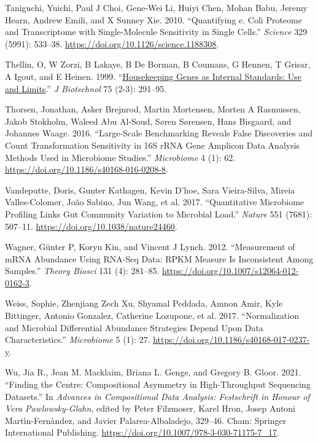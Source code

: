 \documentclass[
]{article}
\newlength{\cslhangindent}
\newlength{\cslentryspacingunit} %
\newenvironment{CSLReferences}[2] %
 {%
  \setlength{\parindent}{0pt}
  \ifodd #1
  \let\oldpar\par
  \def\par{\hangindent=\cslhangindent\oldpar}
  \fi
  \setlength{\parskip}{#2\cslentryspacingunit}
 }%
 {}
\begin{document}
\begin{CSLReferences}{1}{0}
\leavevmode{}%
Taniguchi, Yuichi, Paul J Choi, Gene-Wei Li, Huiyi Chen, Mohan Babu,
Jeremy Hearn, Andrew Emili, and X Sunney Xie. 2010. {``Quantifying e.
Coli Proteome and Transcriptome with Single-Molecule Sensitivity in
Single Cells.''} \emph{Science} 329 (5991): 533--38.
\url{https://doi.org/10.1126/science.1188308}.

\leavevmode{}%
Thellin, O, W Zorzi, B Lakaye, B De Borman, B Coumans, G Hennen, T
Grisar, A Igout, and E Heinen. 1999.
{``\href{https://www.ncbi.nlm.nih.gov/pubmed/10617337}{Housekeeping
Genes as Internal Standards: Use and Limits}.''} \emph{J Biotechnol} 75
(2-3): 291--95.

\leavevmode{}%
Thorsen, Jonathan, Asker Brejnrod, Martin Mortensen, Morten A Rasmussen,
Jakob Stokholm, Waleed Abu Al-Soud, Søren Sørensen, Hans Bisgaard, and
Johannes Waage. 2016. {``Large-Scale Benchmarking Reveals False
Discoveries and Count Transformation Sensitivity in 16{S} r{RNA} Gene
Amplicon Data Analysis Methods Used in Microbiome Studies.''}
\emph{Microbiome} 4 (1): 62.
\url{https://doi.org/10.1186/s40168-016-0208-8}.

\leavevmode{}%
Vandeputte, Doris, Gunter Kathagen, Kevin D'hoe, Sara Vieira-Silva,
Mireia Valles-Colomer, João Sabino, Jun Wang, et al. 2017.
{``Quantitative Microbiome Profiling Links Gut Community Variation to
Microbial Load.''} \emph{Nature} 551 (7681): 507--11.
\url{https://doi.org/10.1038/nature24460}.

\leavevmode{}%
Wagner, Günter P, Koryu Kin, and Vincent J Lynch. 2012. {``Measurement
of mRNA Abundance Using RNA-Seq Data: RPKM Measure Is Inconsistent Among
Samples.''} \emph{Theory Biosci} 131 (4): 281--85.
\url{https://doi.org/10.1007/s12064-012-0162-3}.

\leavevmode{}%
Weiss, Sophie, Zhenjiang Zech Xu, Shyamal Peddada, Amnon Amir, Kyle
Bittinger, Antonio Gonzalez, Catherine Lozupone, et al. 2017.
{``Normalization and Microbial Differential Abundance Strategies Depend
Upon Data Characteristics.''} \emph{Microbiome} 5 (1): 27.
\url{https://doi.org/10.1186/s40168-017-0237-y}.

\leavevmode{}%
Wu, Jia R., Jean M. Macklaim, Briana L. Genge, and Gregory B. Gloor.
2021. {``Finding the Centre: Compositional Asymmetry in High-Throughput
Sequencing Datasets.''} In \emph{Advances in Compositional Data
Analysis: Festschrift in Honour of Vera Pawlowsky-Glahn}, edited by
Peter Filzmoser, Karel Hron, Josep Antoni Martìn-Fernàndez, and Javier
Palarea-Albaladejo, 329--46. Cham: Springer International Publishing.
\url{https://doi.org/10.1007/978-3-030-71175-7_17}.


\end{CSLReferences}
\end{document}
